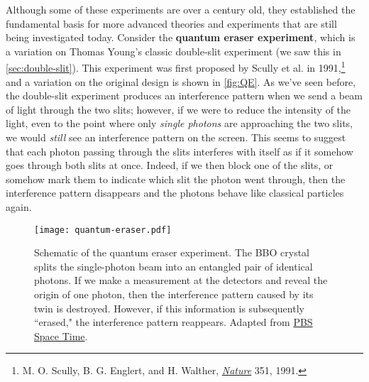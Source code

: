 Although some of these experiments are over a century old, they established the fundamental basis for more advanced theories and experiments that are still being investigated today. 
Consider the \textbf{quantum eraser experiment}, which is a variation on Thomas Young's classic double-slit experiment (we saw this in \autoref{sec:double-slit}). 
This experiment was first proposed by Scully et al. in 1991,\footnote{M. O. Scully, B. G. Englert, and H. Walther, \href{https://www.nature.com/nature/journal/v351/n6322/abs/351111a0.html}{\emph{Nature}} 351, 1991.} and a variation on the original design is shown in \autoref{fig:QE}. 
As we've seen before, the double-slit experiment produces an interference pattern when we send a beam of light through the two slits; however, if we were to reduce the intensity of the light, even to the point where only \emph{single photons} are approaching the two slits, we would \emph{still} see an interference pattern on the screen. 
This seems to suggest that each photon passing through the slits interferes with itself as if it somehow goes through both slits at once. 
Indeed, if we then block one of the slits, or somehow mark them to indicate which slit the photon went through, then the interference pattern disappears and the photons behave like classical particles again. 

\begin{figure}[!h]
	\centering
	\texttt{[image: quantum-eraser.pdf]}
	\caption{Schematic of the quantum eraser experiment. 
	The BBO crystal splits the single-photon beam into an entangled pair of identical photons. 
	If we make a measurement at the detectors and reveal the origin of one photon, then the interference pattern caused by its twin is destroyed. 
	However, if this information is subsequently ``erased," the interference pattern reappears. 
	Adapted from \href{https://www.pbs.org/video/pbs-space-time-quantum-eraser/}{PBS Space Time}.
	}
	\label{fig:QE}
\end{figure}

